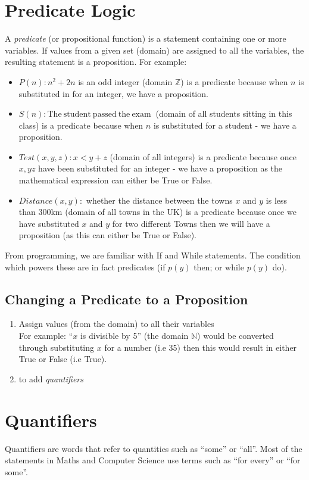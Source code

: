 \section{Predicate Logic}
A \textit{predicate} (or propositional function) is a statement containing one or more variables. If values from a given set (domain) are assigned to all the variables, the resulting statement is a proposition. For example:
\begin{itemize}
    \item $P(n) : n^2 +2n$ is an odd integer (domain $\mathbb{Z}$) is a predicate because when $n$ is substituted in for an integer, we have a proposition.
    \item $S(n) : \mathrm{The\ student\ passed\ the\ exam\ }$ (domain of all students sitting in this class) is a predicate because when $n$ is substituted for a student - we have a proposition.
    \item $Test(x, y, z) : x < y + z$ (domain of all integers) is a predicate because once $x, y z$ have been substituted for an integer - we have a proposition as the mathematical expression can either be True or False.
    \item $Distance(x,y):$ whether the distance between the towns $x$ and $y$ is less than 300km (domain of all towns in the UK) is a predicate because once we have substituted $x$ and $y$ for two different Towns then we will have a proposition (as this can either be True or False). 
\end{itemize}
From programming, we are familiar with If and While statements. The condition which powers these are  in fact predicates (if $p(y)$ then; or while $p(y)$ do).\\

\subsection{Changing a Predicate to a Proposition}
\begin{enumerate}
    \item Assign values (from the domain) to all their variables\\
    For example: ``$x$ is divisible by 5'' (the domain $\mathbb{N}$) would be converted through substituting $x$ for a number (i.e 35) then this would result in either True or False (i.e True). 
    \item to add \textit{quantifiers}
\end{enumerate}

\section{Quantifiers}
Quantifiers are words that refer to quantities such as ``some'' or ``all''. Most of the statements in Maths and Computer Science use terms such as ``for every'' or ``for some''.\\

